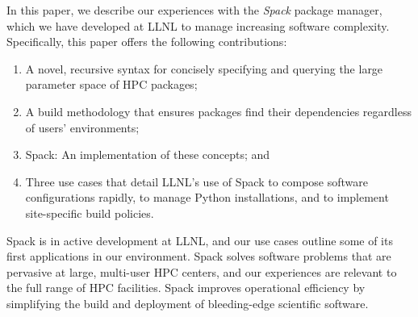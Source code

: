 In this paper, we describe our experiences with the {\it Spack} package manager,
which we have developed at LLNL to manage increasing software complexity.
Specifically, this paper offers the following contributions:
\begin{enumerate}
\item A novel, recursive syntax for concisely specifying and querying
      the large parameter space of HPC packages;
\item A build methodology that ensures packages find their dependencies
      regardless of users' environments; 
\item Spack: An implementation of these concepts; and
\item Three use cases that detail LLNL's use of Spack to compose
      software configurations rapidly, to manage Python installations, and 
      to implement site-specific build policies.
\end{enumerate}

\noindent Spack is in active development at LLNL, and our use cases outline some of
its first applications in our environment.  Spack solves software problems 
that are pervasive at large, multi-user HPC centers, and our experiences 
are relevant to the full range of HPC facilities.  Spack improves
operational efficiency by simplifying the build and deployment of 
bleeding-edge scientific software.
